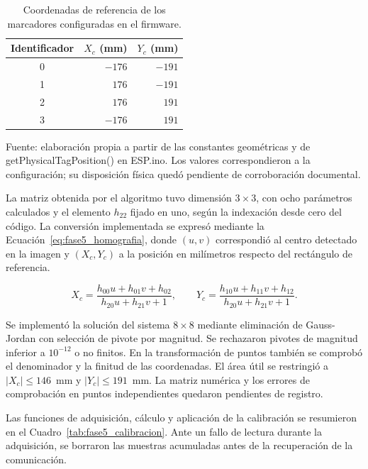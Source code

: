 \begin{table}[H]
    \centering
    \caption{Coordenadas de referencia de los marcadores configuradas en el firmware.}
    \label{tab:fase5_tags}
    \begin{tabular}{crr}
        \hline
        Identificador & $X_c$ (mm) & $Y_c$ (mm) \\
        \hline
        0 & $-176$ & $-191$ \\
        1 & $176$ & $-191$ \\
        2 & $176$ & $191$ \\
        3 & $-176$ & $191$ \\
        \hline
    \end{tabular}
    \par\small\raggedright Fuente: elaboración propia a partir de las constantes geométricas y de getPhysicalTagPosition() en ESP.ino. Los valores correspondieron a la configuración; su disposición física quedó pendiente de corroboración documental.
\end{table}

La matriz obtenida por el algoritmo tuvo dimensión $3\times3$, con ocho parámetros calculados y el elemento $h_{22}$ fijado en uno, según la indexación desde cero del código. La conversión implementada se expresó mediante la Ecuación~\ref{eq:fase5_homografia}, donde $(u,v)$ correspondió al centro detectado en la imagen y $(X_c,Y_c)$ a la posición en milímetros respecto del rectángulo de referencia.

\begin{equation}
 X_c=\frac{h_{00}u+h_{01}v+h_{02}}{h_{20}u+h_{21}v+1},\qquad
 Y_c=\frac{h_{10}u+h_{11}v+h_{12}}{h_{20}u+h_{21}v+1}.
 \label{eq:fase5_homografia}
\end{equation}

Se implementó la solución del sistema $8\times8$ mediante eliminación de Gauss-Jordan con selección de pivote por magnitud. Se rechazaron pivotes de magnitud inferior a $10^{-12}$ o no finitos. En la transformación de puntos también se comprobó el denominador y la finitud de las coordenadas. El área útil se restringió a $|X_c|\leq146$~mm y $|Y_c|\leq191$~mm. La matriz numérica y los errores de comprobación en puntos independientes quedaron pendientes de registro.

Las funciones de adquisición, cálculo y aplicación de la calibración se resumieron en el Cuadro~\ref{tab:fase5_calibracion}. Ante un fallo de lectura durante la adquisición, se borraron las muestras acumuladas antes de la recuperación de la comunicación.

